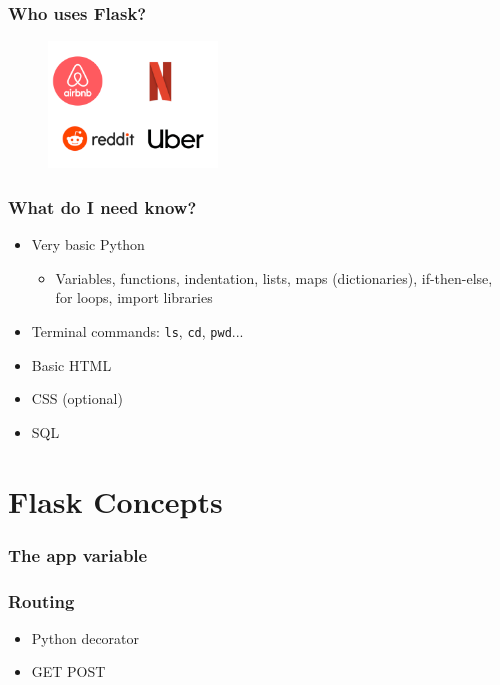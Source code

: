 \documentclass[fleqn,aspectratio=169,10pt]{beamer}
\begin{document}
\begin{frame}[fragile]
  \frametitle{Who uses Flask?}
          \pause
  \begin{figure}[]
    \centering
    \includegraphics[width=0.4\textwidth]{companies}
  \end{figure}
\end{frame}

\begin{frame}
  \frametitle{What do I need know?}
  \begin{itemize}
          \pause
    \item Very basic Python
          \begin{itemize}
            \item Variables, functions, indentation, lists, maps (dictionaries), if-then-else, for loops, import libraries
          \end{itemize}
    \item Terminal commands: \texttt{ls}, \texttt{cd}, \texttt{pwd}...
    \item Basic HTML
    \item CSS (optional)
    \item SQL
  \end{itemize}
\end{frame}

\section{Flask Concepts}
\begin{frame}
  \frametitle{The app variable}

\end{frame}

\begin{frame}
  \frametitle{Routing}
  \begin{itemize}
    \item Python decorator
    \item GET POST
  \end{itemize}

\end{frame}
\end{document}
